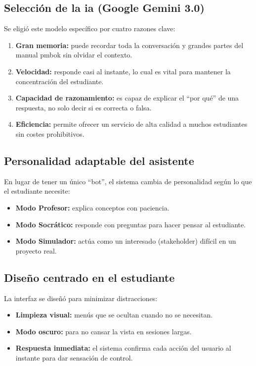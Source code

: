 \subsection{Selección de la \gls{ia} (Google Gemini 3.0)}
Se eligió este modelo específico por cuatro razones clave:
\begin{enumerate}
\item \textbf{Gran memoria:} puede recordar toda la conversación y grandes partes del manual \gls{pmbok} sin olvidar el contexto.
\item \textbf{Velocidad:} responde casi al instante, lo cual es vital para mantener la concentración del estudiante.
\item \textbf{Capacidad de razonamiento:} es capaz de explicar el \enquote{por qué} de una respuesta, no solo decir si es correcta o falsa.
\item \textbf{Eficiencia:} permite ofrecer un servicio de alta calidad a muchos estudiantes sin costes prohibitivos.
\end{enumerate}

\subsection{Personalidad adaptable del asistente}
En lugar de tener un único \enquote{bot}, el sistema cambia de personalidad según lo que el estudiante necesite:
\begin{itemize}
\item \textbf{Modo Profesor:} explica conceptos con paciencia.
\item \textbf{Modo Socrático:} responde con preguntas para hacer pensar al estudiante.
\item \textbf{Modo Simulador:} actúa como un interesado (stakeholder) difícil en un proyecto real.
\end{itemize}

\subsection{Diseño centrado en el estudiante}
La interfaz se diseñó para minimizar distracciones:
\begin{itemize}
\item \textbf{Limpieza visual:} menús que se ocultan cuando no se necesitan.
\item \textbf{Modo oscuro:} para no cansar la vista en sesiones largas.
\item \textbf{Respuesta inmediata:} el sistema confirma cada acción del usuario al instante para dar sensación de control.
\end{itemize}
